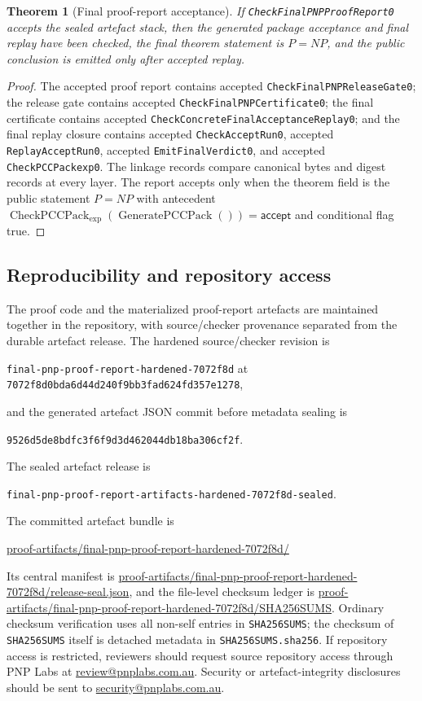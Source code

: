 \documentclass[10.5pt,a4paper]{article}
\newtheorem{theorem}{Theorem}[section]
\newcommand{\CheckPack}{\operatorname{CheckPCCPack}_{\exp}}
\newcommand{\GenPack}{\operatorname{GeneratePCCPack}}
\begin{document}
\begin{theorem}[Final proof-report acceptance]
If \texttt{CheckFinalPNPProofReport0} accepts the sealed artefact stack, then the generated package acceptance and final replay have been checked, the final theorem statement is \(P=NP\), and the public conclusion is emitted only after accepted replay.
\end{theorem}

\begin{proof}
The accepted proof report contains accepted \texttt{CheckFinalPNPReleaseGate0}; the release gate contains accepted \texttt{CheckFinalPNPCertificate0}; the final certificate contains accepted \texttt{CheckConcreteFinalAcceptanceReplay0}; and the final replay closure contains accepted \texttt{CheckAcceptRun0}, accepted \texttt{ReplayAcceptRun0}, accepted \texttt{EmitFinalVerdict0}, and accepted \texttt{CheckPCCPackexp0}.  The linkage records compare canonical bytes and digest records at every layer.  The report accepts only when the theorem field is the public statement \(P=NP\) with antecedent \(\CheckPack(\GenPack())=\mathsf{accept}\) and conditional flag true.
\end{proof}

\subsection{Reproducibility and repository access}
The proof code and the materialized proof-report artefacts are maintained together in the repository, with source/checker provenance separated from the durable artefact release.  The hardened source/checker revision is
\begin{center}
\texttt{final-pnp-proof-report-hardened-7072f8d} at \texttt{7072f8d0bda6d44d240f9bb3fad624fd357e1278},
\end{center}
and the generated artefact JSON commit before metadata sealing is
\begin{center}
\texttt{9526d5de8bdfc3f6f9d3d462044db18ba306cf2f}.
\end{center}
The sealed artefact release is
\begin{center}
\texttt{final-pnp-proof-report-artifacts-hardened-7072f8d-sealed}.
\end{center}
The committed artefact bundle is
\begin{center}
\url{proof-artifacts/final-pnp-proof-report-hardened-7072f8d/}
\end{center}
Its central manifest is \url{proof-artifacts/final-pnp-proof-report-hardened-7072f8d/release-seal.json}, and the file-level checksum ledger is \url{proof-artifacts/final-pnp-proof-report-hardened-7072f8d/SHA256SUMS}.  Ordinary checksum verification uses all non-self entries in \texttt{SHA256SUMS}; the checksum of \texttt{SHA256SUMS} itself is detached metadata in \texttt{SHA256SUMS.sha256}.  If repository access is restricted, reviewers should request source repository access through PNP Labs at \href{mailto:review@pnplabs.com.au}{review@pnplabs.com.au}. Security or artefact-integrity disclosures should be sent to \href{mailto:security@pnplabs.com.au}{security@pnplabs.com.au}.
\end{document}

